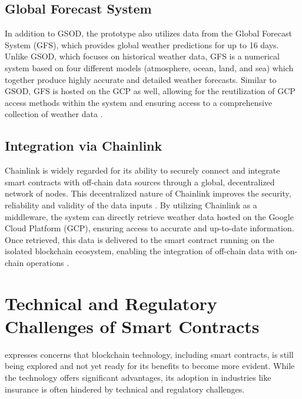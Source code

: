 \subsection{Global Forecast System}
In addition to GSOD, the prototype also utilizes data from the Global Forecast System (GFS), which provides global weather predictions for up to 16 days. Unlike GSOD, which focuses on historical weather data, GFS is a numerical system based on four different models (atmosphere, ocean, land, and sea) which together produce highly accurate and detailed weather forecasts. Similar to GSOD, GFS is hosted on the GCP as well, allowing for the reutilization of GCP access methods within the system and ensuring access to a comprehensive collection of weather data \autocite{NOAA_GSOD_2020}.

\subsection{Integration via Chainlink}
Chainlink is widely regarded for its ability to securely connect and integrate smart contracts with off-chain data sources through a global, decentralized network of nodes. This decentralized nature of Chainlink improves the security, reliability and validity of the data inputs \autocite{beniiche2020study}. By utilizing Chainlink as a middleware, the system can directly retrieve weather data hosted on the Google Cloud Platform (GCP), ensuring access to accurate and up-to-date information. Once retrieved, this data is delivered to the smart contract running on the isolated blockchain ecosystem, enabling the integration of off-chain data with on-chain operations \autocite{goswami2022towards}.

\section{Technical and Regulatory Challenges of Smart Contracts}\label{section:regulatory_technical_challenges}
\textcite{gatteschi2018blockchain} expresses concerns that blockchain technology, including smart contracts, is still being explored and not yet ready for its benefits to become more evident. While the technology offers significant advantages, its adoption in industries like insurance is often hindered by technical and regulatory challenges.

